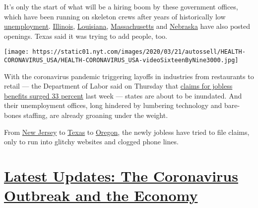 It's only the start of what will be a hiring boom by these government
offices, which have been running on skeleton crews after years of
historically low
\href{https://www.nytimes.com/2020/04/03/upshot/coronavirus-jobless-rate-great-depression.html}{unemployment}.
\href{https://www.linkedin.com/jobs/view/1781957964/?eBP=NotAvailableFromVoyagerAPI\&refId=a42318c2-4f6f-4ec4-9d40-6d8e7c734cb3\&trk=d_flagship3_search_srp_jobs}{Illinois},
\href{https://www.linkedin.com/jobs/view/1781925553/?eBP=NotAvailableFromVoyagerAPI\&refId=f4bff901-d957-4d06-b4e1-ffeb31a8d5fd\&trk=d_flagship3_search_srp_jobs}{Louisiana},
\href{https://www.linkedin.com/jobs/view/1786824548/?eBP=NotAvailableFromVoyagerAPI\&refId=a42318c2-4f6f-4ec4-9d40-6d8e7c734cb3\&trk=d_flagship3_search_srp_jobs}{Massachusetts}
and
\href{https://www.linkedin.com/jobs/view/1780250882/?eBP=NotAvailableFromVoyagerAPI\&refId=eb500c71-3647-4c52-a69a-4f6c5a6bcde1\&trk=d_flagship3_search_srp_jobs}{Nebraska}
have also posted openings. Texas said it was trying to add people, too.

\texttt{[image: https://static01.nyt.com/images/2020/03/21/autossell/HEALTH-CORONAVIRUS\_USA/HEALTH-CORONAVIRUS\_USA-videoSixteenByNine3000.jpg]}

With the coronavirus pandemic triggering layoffs in industries from
restaurants to retail --- the Department of Labor said on Thursday that
\href{https://www.dol.gov/sites/dolgov/files/OPA/newsreleases/ui-claims/20200480.pdf}{claims
for jobless benefits surged 33 percent} last week --- states are about
to be inundated. And their unemployment offices, long hindered by
lumbering technology and bare-bones staffing, are already groaning under
the weight.

From
\href{https://twitter.com/faregametravel/status/1239968403537809411}{New
Jersey} to \href{http://texas}{Texas} to \href{http://oregon}{Oregon},
the newly jobless have tried to file claims, only to run into glitchy
websites and clogged phone lines.

\hypertarget{latest-updates-the-coronavirus-outbreak-and-the-economy}{%
\section{\texorpdfstring{\href{https://www.nytimes.com/live/2020/08/17/business/stock-market-today-coronavirus?action=click\&pgtype=Article\&state=default\&region=MAIN_CONTENT_1\&context=storylines_live_updates}{Latest
Updates: The Coronavirus Outbreak and the
Economy}}{Latest Updates: The Coronavirus Outbreak and the Economy}}\label{latest-updates-the-coronavirus-outbreak-and-the-economy}}

